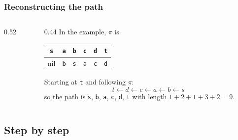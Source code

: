 \documentclass[aspectratio=169,10pt,compress]{beamer}
\begin{document}
\begin{frame}[t,fragile] \frametitle{Reconstructing the path}
  \begin{columns}[T]
    \begin{column}{0.52\textwidth}


\begin{algorithm}[H]
  \caption{Shortest path from $s$ to $t$}
\end{algorithm}

    \end{column}
    \begin{column}{0.44\textwidth}
      \small In the example, $\pi$ is
      \begin{center}
        \begin{tabular}{@{}cccccc@{}}
          \toprule
          \texttt{s} & \texttt{a} & \texttt{b} & \texttt{c} & \texttt{d} & \texttt{t} \\
          \midrule
          nil & \texttt{b} & \texttt{s} & \texttt{a} & \texttt{c} & \texttt{d} \\
          \bottomrule
        \end{tabular}
      \end{center}
      Starting at \texttt{t} and following $\pi$:
      \[
      	t \leftarrow d \leftarrow c \leftarrow a \leftarrow b \leftarrow s
      \]
      so the path is \texttt{s}, \texttt{b}, \texttt{a}, \texttt{c}, \texttt{d}, \texttt{t} with length $1 + 2 + 1 + 3 + 2 = 9$.
    \end{column}
  \end{columns}
\end{frame}


\subsection[Trace]{Step by step}
\end{document}
